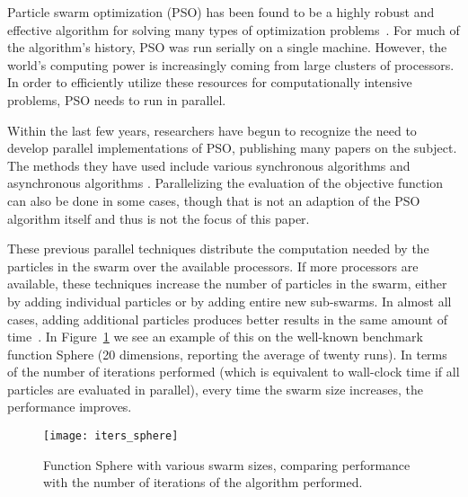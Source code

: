 \documentclass[ms]{byuprop}
\newcommand{\figref}[1]{Figure~\ref{fig:#1}}
\begin{document}
Particle swarm optimization (PSO) has been found to be a highly robust and
effective algorithm for solving many types of optimization
problems~\citep{poli-2008-pso-applications}.  For much of the algorithm's
history, PSO was run serially on a single machine.  However, the world's
computing power is increasingly coming from large clusters of processors.  In
order to efficiently utilize these resources for computationally intensive
problems, PSO needs to run in parallel.

Within the last few years, researchers have begun to recognize the need to
develop parallel implementations of PSO, publishing many papers on the subject.
The methods they have used include various synchronous algorithms
\citep{chu-2006-intelligent-parallel-pso,jin-2005-pso-antenna-designs,%
parsopoulos-2004-parallel-vector-evaluated-pso,%
schutte-2004-parallel-global-optimization-with-pso} and asynchronous algorithms
\citep{mostaghim-2006-multi-objective-pso-on-grids,%
venter-2005-parallel-pso-asynchronous-evaluations}.  Parallelizing the
evaluation of the objective function can also be done in some cases, though
that is not an adaption of the PSO algorithm itself and thus is not the focus
of this paper.

These previous parallel techniques distribute the computation needed by the
particles in the swarm over the available processors.  If more processors are
available, these techniques increase the number of particles in the swarm,
either by adding individual particles or by adding entire new sub-swarms.  In
almost all cases, adding additional particles produces better results in the
same amount of time~\citep{mcnabb-2009-large-particle-swarms}.  In
\figref{iters-sphere} we see an example of this on the well-known benchmark
function Sphere (20 dimensions, reporting the average of twenty runs).  In
terms of the number of iterations performed (which is equivalent to wall-clock
time if all particles are evaluated in parallel), every time the swarm size
increases, the performance improves.

\begin{figure}
  \centering
  \texttt{[image: iters\_sphere]}
  \caption{Function Sphere with various swarm sizes, comparing performance with
  the number of iterations of the algorithm performed.}
  \label{fig:iters-sphere}
\end{figure}
\end{document}
